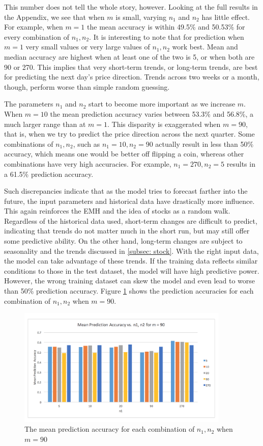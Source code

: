 \documentclass[pageno]{jpaper}
\begin{document}
\newpage
This number does not tell the whole story, however. Looking at the full results in the Appendix, we see that when $m$ is small, varying $n_1$ and $n_2$ has little effect. For example, when $m=1$ the mean accuracy is within 49.5\% and 50.53\% for every combination of $n_1, n_2$. It is interesting to note that for prediction when $m=1$ very small values or very large values of $n_1, n_2$ work best. Mean and median accuracy are highest when at least one of the two is 5, or when both are 90 or 270. This implies that very short-term trends, or long-term trends, are best for predicting the next day's price direction. Trends across two weeks or a month, though, perform worse than simple random guessing.

The parameters $n_1$ and $n_2$ start to become more important as we increase $m$. When $m=10$ the mean prediction accuracy varies between 53.3\% and 56.8\%, a much larger range than at $m=1$. This disparity is exaggerated when $m=90$, that is, when we try to predict the price direction across the next quarter. Some combinations of $n_1, n_2$, such as $n_1=10, n_2=90$ actually result in less than 50\% accuracy, which means one would be better off flipping a coin, whereas other combinations have very high accuracies. For example, $n_1 = 270, n_2 = 5$ results in a 61.5\% prediction accuracy. 

Such discrepancies indicate that as the model tries to forecast farther into the future, the input parameters and historical data have drastically more influence. This again reinforces the EMH and the idea of stocks as a random walk. Regardless of the historical data used, short-term changes are difficult to predict, indicating that trends do not matter much in the short run, but may still offer some predictive ability. On the other hand, long-term changes are subject to seasonality and the trends discussed in \ref{subsec: stock}. With the right input data, the model can take advantage of these trends. If the training data reflects similar conditions to those in the test dataset, the model will have high predictive power. However, the wrong training dataset can skew the model and even lead to worse than 50\% prediction accuracy. Figure \ref{fig: meansforquarter} shows the prediction accuracies for each combination of $n_1, n_2$ when $m=90$.
\vspace{20pt}
\begin{figure}[htb]
\includegraphics[width=0.9\textwidth]{MeanAccuraciesForQuarter.png}
\caption{The mean prediction accuracy for each combination of $n_1, n_2$ when $m=90$}
\label{fig: meansforquarter}
\end{figure}
\end{document}
